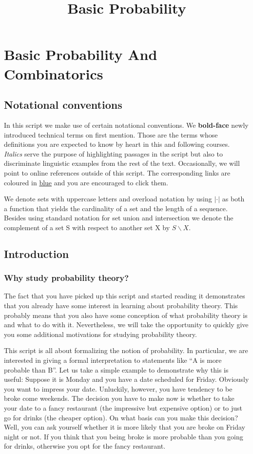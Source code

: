 \documentclass[a4paper,11pt,leqno]{report}
\title{Basic Probability}
\date{}
\begin{document}
\chapter{Basic Probability And Combinatorics}

\section*{Notational conventions}
In this script we make use of certain notational conventions. We \textbf{bold-face} newly introduced
technical terms on first mention. Those are the terms whose definitions you are expected to know by heart
in this and following courses. \textit{Italics} serve the purpose of highlighting passages in the
script but also to discriminate linguistic examples from the rest of the text. Occasionally, we will
point to online references outside of this script. The corresponding links are coloured in  
\href{http://en.wikibooks.org/wiki/LaTeX/Hyperlinks}{blue} and you are encouraged to click them.

We denote sets with uppercase letters and overload notation by using $ |\cdot| $ as both a function
that yields the cardinality of a set and the length of a sequence. Besides using standard notation
for set union and intersection we denote the complement of a set S with respect to another set X by
$ S\backslash X $.

\section{Introduction}
\subsection{Why study probability theory?}
The fact that you have picked up this script and started reading it demonstrates that you already have
some interest in learning about probability theory. This probably means that you also have some conception
of what probability theory is and what to do with it. Nevertheless, we will take the opportunity to
quickly give you some additional motivations for studying probability theory.

This script is all about formalizing the notion of probability. In particular, we are interested in 
giving a formal interpretation to statements like ``A is more probable than B''. Let us take a simple
example to demonstrate why this is useful: Suppose it is Monday and you have a date scheduled for
Friday. Obviously you want to impress your date. Unluckily, however, you have tendency to be broke
come weekends. The decision you have to make now is whether to take your date to a fancy restaurant
(the impressive but expensive option) or to just go for drinks (the cheaper option). On what basis can
you make this decision? Well, you can ask yourself whether it is more likely that you are broke on 
Friday night or not. If you think that you being broke is more probable than you going for drinks, otherwise
you opt for the fancy restaurant.
\end{document}
